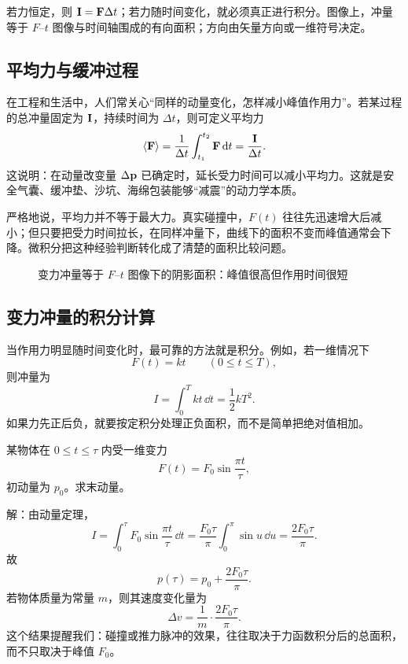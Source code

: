 \begin{remark}
若力恒定，则 $\vb I=\vb F\Delta t$；若力随时间变化，就必须真正进行积分。图像上，冲量等于 $F$--$t$ 图像与时间轴围成的有向面积；方向由矢量方向或一维符号决定。
\end{remark}

\subsection{平均力与缓冲过程}

在工程和生活中，人们常关心“同样的动量变化，怎样减小峰值作用力”。若某过程的总冲量固定为 $\vb I$，持续时间为 $\Delta t$，则可定义平均力
\[
\langle \vb F \rangle=\frac{1}{\Delta t}\int_{t_1}^{t_2}\vb F\,\dd t=\frac{\vb I}{\Delta t}.
\]
这说明：在动量改变量 $\Delta\vb p$ 已确定时，延长受力时间可以减小平均力。这就是安全气囊、缓冲垫、沙坑、海绵包装能够“减震”的动力学本质。

严格地说，平均力并不等于最大力。真实碰撞中，$F(t)$ 往往先迅速增大后减小；但只要把受力时间拉长，在同样冲量下，曲线下的面积不变而峰值通常会下降。微积分把这种经验判断转化成了清楚的面积比较问题。

\begin{figure}[htbp]
\centering
{}
\caption{变力冲量等于 $F$--$t$ 图像下的阴影面积：峰值很高但作用时间很短}
\end{figure}

\subsection{变力冲量的积分计算}

当作用力明显随时间变化时，最可靠的方法就是积分。例如，若一维情况下
\[
F(t)=kt\qquad (0\le t\le T),
\]
则冲量为
\[
I=\int_0^T kt\,\dd t=\frac12 kT^2.
\]
如果力先正后负，就要按定积分处理正负面积，而不是简单把绝对值相加。

\begin{example}
某物体在 $0\le t\le \tau$ 内受一维变力
\[
F(t)=F_0\sin\frac{\pi t}{\tau},
\]
初动量为 $p_0$。求末动量。

解：由动量定理，
\[
I=\int_0^{\tau}F_0\sin\frac{\pi t}{\tau}\,\dd t
=\frac{F_0\tau}{\pi}\int_0^{\pi}\sin u\,\dd u
=\frac{2F_0\tau}{\pi}.
\]
故
\[
p(\tau)=p_0+\frac{2F_0\tau}{\pi}.
\]
若物体质量为常量 $m$，则其速度变化量为
\[
\Delta v=\frac{1}{m}\cdot \frac{2F_0\tau}{\pi}.
\]
这个结果提醒我们：碰撞或推力脉冲的效果，往往取决于力函数积分后的总面积，而不只取决于峰值 $F_0$。
\end{example}

